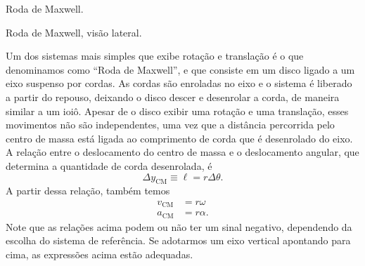 \begin{marginfigure}[-1.5cm]
\begin{tikzpicture}[>=Stealth, rotate = -95,
     interface/.style={
        postaction={draw,decorate,decoration={border,angle=-45,
                    amplitude=0.2cm,segment length=2mm}}},
    ]
\end{tikzpicture}
\caption{Roda de Maxwell.\label{Fig:RodaDeMaxwell}}
\end{marginfigure}

\begin{marginfigure}[1.5cm]
\centering
{}
\caption{Roda de Maxwell, visão lateral.\label{Fig:RodaDeMaxwellVisaoLateral}}
\end{marginfigure}

Um dos sistemas mais simples que exibe rotação e translação é o que denominamos como ``Roda de Maxwell'', e que consiste em um disco ligado a um eixo suspenso por cordas. As cordas são enroladas no eixo e o sistema é liberado a partir do repouso, deixando o disco descer e desenrolar a corda, de maneira similar a um ioiô. Apesar de o disco exibir uma rotação e uma translação, esses movimentos não são independentes, uma vez que a distância percorrida pelo centro de massa está ligada ao comprimento de corda que é desenrolado do eixo. A relação entre o deslocamento do centro de massa e o deslocamento angular, que determina a quantidade de corda desenrolada, é
\begin{equation}
    \Delta y_{\text{CM}} \equiv \ell = r \Delta \theta.
\end{equation}
%
A partir dessa relação, também temos
\begin{align}
    v_{\text{CM}} &= r \omega \\
    a_{\text{CM}} &= r \alpha.
\end{align}
%
Note que as relações acima podem ou não ter um sinal negativo, dependendo da escolha do sistema de referência. Se adotarmos um eixo vertical apontando para cima, as expressões acima estão adequadas. %

